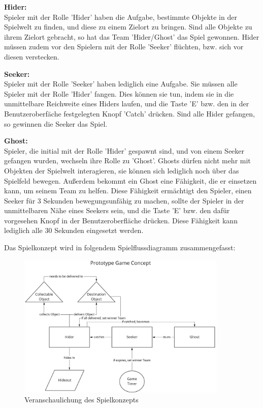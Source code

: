 \textbf{Hider:} \\
Spieler mit der Rolle 'Hider' haben die Aufgabe, bestimmte Objekte in der Spielwelt zu finden, und diese zu einem Zielort zu bringen. Sind alle Objekte zu ihrem Zielort gebracht, so hat das Team 'Hider/Ghost' das Spiel gewonnen. Hider müssen zudem vor den Spielern mit der Rolle 'Seeker' flüchten, bzw. sich vor diesen verstecken. 

\textbf{Seeker:} \\
Spieler mit der Rolle 'Seeker' haben lediglich eine Aufgabe. Sie müssen alle Spieler mit der Rolle 'Hider' fangen. Dies können sie tun, indem sie in die unmittelbare Reichweite eines Hiders laufen, und die Taste 'E' bzw. den in der Benutzeroberfäche festgelegten Knopf 'Catch' drücken. Sind alle Hider gefangen, so gewinnen die Seeker das Spiel.

\textbf{Ghost:} \\
Spieler, die initial mit der Rolle 'Hider' gespawnt sind, und von einem Seeker gefangen wurden, wechseln ihre Rolle zu 'Ghost'. Ghosts dürfen nicht mehr mit Objekten der Spielwelt interagieren, sie können sich lediglich noch über das Spielfeld bewegen. Außerdem bekommt ein Ghost eine Fähigkeit, die er einsetzen kann, um seinem Team zu helfen. Diese Fähigkeit ermächtigt den Spieler, einen Seeker für 3 Sekunden bewegungsunfähig zu machen, sollte der Spieler in der unmittelbaren Nähe eines Seekers sein, und die Taste 'E' bzw. den dafür vorgesehen Knopf in der Benutzeroberfläche drücken. Diese Fähigkeit kann lediglich alle 30 Sekunden eingesetzt werden.

Das Spielkonzept wird in folgendem Spielflussdiagramm zusammengefasst:

\begin{figure}[H]
	\centering
	\includegraphics[width=100mm]{images/game_concept.jpg}
	\caption[Spielkonzept Diagramm]{Veranschaulichung des Spielkonzepts}
	\label{pic:game_concept}
\end{figure}

